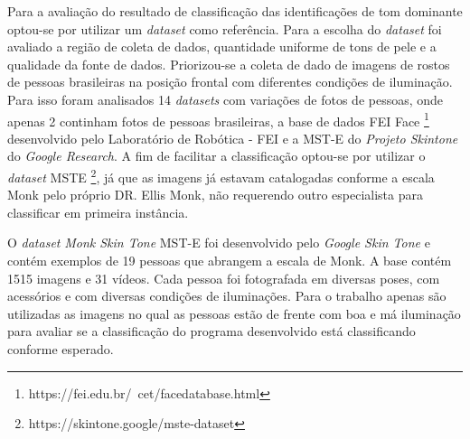 Para a avaliação do resultado de classificação das identificações de tom dominante optou-se por utilizar um \textit{dataset} como referência. Para a escolha do \textit{dataset} foi avaliado a região de coleta de dados, quantidade uniforme de tons de pele e a qualidade da fonte de dados. Priorizou-se a coleta de dado de imagens de rostos de pessoas brasileiras na posição frontal com diferentes condições de iluminação. Para isso foram analisados 14 \textit{datasets} com variações de fotos de pessoas, onde apenas 2 continham fotos de pessoas brasileiras, a base de dados FEI Face \footnote{https://fei.edu.br/~cet/facedatabase.html} desenvolvido pelo Laboratório de Robótica - FEI e a MST-E do \textit{Projeto Skintone} do \textit{Google Research}. A fim de facilitar a classificação optou-se por utilizar o \textit{dataset} MSTE \footnote{https://skintone.google/mste-dataset}, já que as imagens já estavam catalogadas conforme a escala Monk pelo próprio DR. Ellis Monk, não requerendo outro especialista para classificar em primeira instância. 

O \textit{dataset} \textit{Monk Skin Tone} MST-E foi desenvolvido pelo \textit{Google Skin Tone} e contém exemplos de 19 pessoas que abrangem a escala de Monk. A base contém 1515 imagens e 31 vídeos. Cada pessoa foi fotografada em diversas poses, com acessórios e com diversas condições de iluminações. Para o trabalho apenas são utilizadas as imagens no qual as pessoas estão de frente com boa e má iluminação para avaliar se a classificação do programa desenvolvido está classificando conforme esperado.
